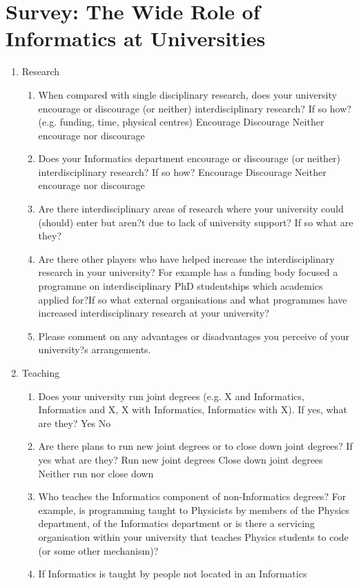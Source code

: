 \newpage
\appendix
\section{Survey: The Wide Role of Informatics at Universities}\label{appendix}
\begin{enumerate}
\item Research
\begin{enumerate}
\item When compared with single disciplinary research, does your
university encourage or discourage (or neither) interdisciplinary
research? If so how? (e.g. funding, time, physical centres)
Encourage
Discourage
Neither encourage nor discourage
\item Does your Informatics department encourage or discourage (or
neither) interdisciplinary research? If so how?
Encourage
Discourage
Neither encourage nor discourage
\item Are there interdisciplinary areas of research where your university
could (should) enter but aren?t due to lack of university support? If so
what are they?
\item Are there other players who have helped increase the
interdisciplinary research in your university?
For example has a funding body focused a programme on
interdisciplinary PhD studentships which academics applied for?If so
what external organisations and what programmes have increased
interdisciplinary research at your university?
\item Please comment on any advantages or disadvantages you perceive
of your university?s arrangements.
\end{enumerate}
\item Teaching
\begin{enumerate}
\item Does your university run joint degrees (e.g. X and Informatics, Informatics and X, X with Informatics, Informatics with X). If yes,
what are they?
Yes
No
\item Are there plans to run new joint degrees or to close down joint
degrees? If yes what are they?
Run new joint degrees
Close down joint degrees
Neither run nor close down
\item Who teaches the Informatics component of non-Informatics degrees? For example, is programming taught to Physicists by members
of the Physics department, of the Informatics department or is there a
servicing organisation within your university that teaches Physics
students to code (or some other mechanism)?
\item If Informatics is taught by people not located in an Informatics

\end{enumerate}
\end{enumerate}
